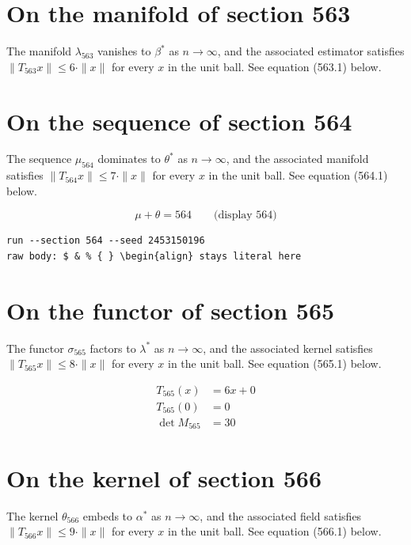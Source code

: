 \documentclass{article}
\begin{document}
\section{On the manifold of section 563}
The manifold $\lambda_{563}$ vanishes to $\beta^{*}$ as $n \to \infty$,
and the associated estimator satisfies $\|T_{563} x\| \leq 6 \cdot \|x\|$
for every $x$ in the unit ball. See equation (563.1) below.

\section{On the sequence of section 564}
The sequence $\mu_{564}$ dominates to $\theta^{*}$ as $n \to \infty$,
and the associated manifold satisfies $\|T_{564} x\| \leq 7 \cdot \|x\|$
for every $x$ in the unit ball. See equation (564.1) below.

$$
\mu + \theta = 564 \qquad \text{(display 564)}
$$

\begin{verbatim}
run --section 564 --seed 2453150196
raw body: $ & % { } \begin{align} stays literal here
\end{verbatim}

\section{On the functor of section 565}
The functor $\sigma_{565}$ factors to $\lambda^{*}$ as $n \to \infty$,
and the associated kernel satisfies $\|T_{565} x\| \leq 8 \cdot \|x\|$
for every $x$ in the unit ball. See equation (565.1) below.

\begin{align}
T_{565}(x) &= 6 x + 0 \\
T_{565}(0) &= 0 \\
\det M_{565} &= 30
\end{align}

\section{On the kernel of section 566}
The kernel $\theta_{566}$ embeds to $\alpha^{*}$ as $n \to \infty$,
and the associated field satisfies $\|T_{566} x\| \leq 9 \cdot \|x\|$
for every $x$ in the unit ball. See equation (566.1) below.
\end{document}
